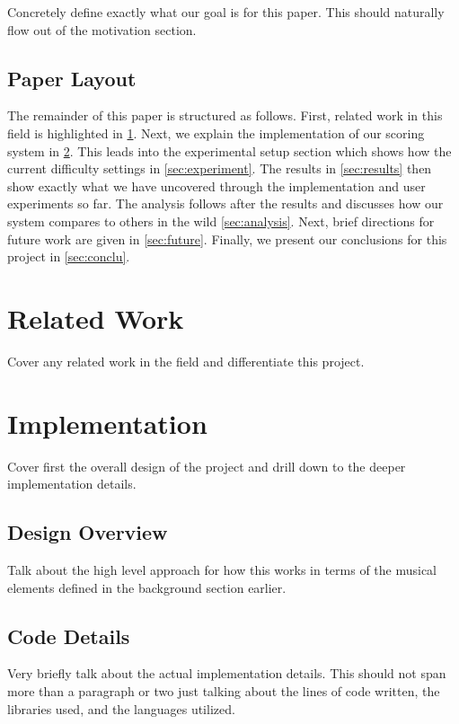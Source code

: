 \documentclass[10pt]{sigplanconf}
\begin{document}
{Concretely define exactly what our goal is for this paper. This should naturally flow out of the motivation section.

\subsection{Paper Layout} 
\label{sec:layout}

The remainder of this paper is structured as follows. First, related work in this field is highlighted in \ref{sec:related}. Next, we explain the implementation of our scoring system in \ref{sec:imple}. This leads into the experimental setup section which shows how the current difficulty settings in \ref{sec:experiment}. The results in \ref{sec:results} then show exactly what we have uncovered through the implementation and user experiments so far. The analysis follows after the results and discusses how our system compares to others in the wild \ref{sec:analysis}. Next, brief directions for future work are given in \ref{sec:future}. Finally, we present our conclusions for this project in \ref{sec:conclu}.

\section{Related Work} 
\label{sec:related}

Cover any related work in the field and differentiate this project.

\section{Implementation} 
\label{sec:imple}

Cover first the overall design of the project and drill down to the deeper implementation details.

\subsection{Design Overview} 
\label{sec:design}

Talk about the high level approach for how this works in terms of the musical elements defined in the background section earlier.

\subsection{Code Details} 
\label{sec:details}

Very briefly talk about the actual implementation details. This should not span more than a paragraph or two just talking about the lines of code written, the libraries used, and the languages utilized.

}
\end{document}
